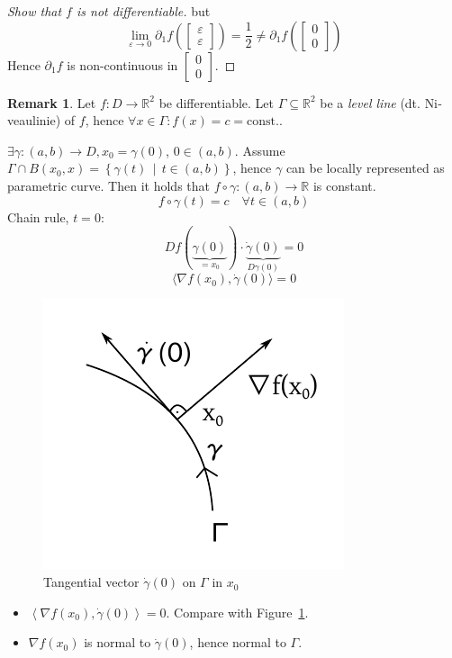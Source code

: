 \documentclass[a4paper,landscape,twocolumn]{article}
\theoremstyle{definition}
\newtheorem{rem}{Remark}
\newcommand\setdef[2]{\left\{#1\,\middle|\,#2\right\}}
\newcommand\ang[2]{\left\langle#1,#2\right\rangle}
\begin{document}
\begin{proof}[Show that $f$ is not differentiable]
  but
  \[ \lim_{\varepsilon \to 0} \partial_1 f(\begin{bmatrix} \varepsilon \\ \varepsilon \end{bmatrix}) = \frac12 \neq \partial_1 f(\begin{bmatrix} 0 \\ 0 \end{bmatrix}) \]
  Hence $\partial_1 f$ is non-continuous in $\begin{bmatrix} 0 \\ 0 \end{bmatrix}$.
\end{proof}

\begin{rem}
  Let $f: D \to \mathbb R^2$ be differentiable.
  Let $\Gamma \subseteq \mathbb R^2$ be a \emph{level line} (dt. \foreignlanguage{ngerman}{Niveaulinie}) of $f$,
  hence $\forall x \in \Gamma: f(x) = c = \text{const.}$.

  $\exists \gamma: (a,b) \to D, x_0 = \gamma(0)$, $0 \in (a,b)$.
  Assume $\Gamma \cap B(x_0, x) = \setdef{\gamma(t)}{t \in (a,b)}$,
  hence $\gamma$ can be locally represented as parametric curve.
  Then it holds that $f \circ \gamma: (a,b) \to \mathbb R$ is constant.
  \[ f \circ \gamma(t) = c \quad \forall t \in (a,b) \]
  Chain rule, $t=0$:
  \[ Df(\underbrace{\gamma(0)}_{=x_0}) \cdot \underbrace{\dot\gamma(0)}_{D\gamma(0)} = 0 \]
  \[ \langle \nabla f(x_0), \dot\gamma(0)\rangle = 0 \]

  \begin{figure}[!h]
    \begin{center}
      \includegraphics{img/tangential_vector.pdf}
      \caption{Tangential vector $\dot{\gamma}(0)$ on $\Gamma$ in $x_0$}
      \label{img:tan}
    \end{center}
  \end{figure}

  \begin{itemize}
    \item $\ang{\nabla f(x_0)}{\dot{\gamma}(0)} = 0$. Compare with Figure~\ref{img:tan}.
    \item $\nabla f(x_0)$ is normal to $\dot\gamma(0)$, hence normal to $\Gamma$.
  \end{itemize}
\end{rem}
\end{document}
